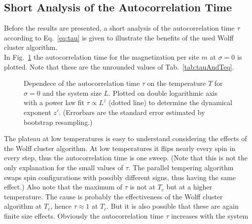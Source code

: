 \subsection{Short Analysis of the Autocorrelation Time}
\label{ssec:results:autocorr}
    Before the results are presented, a short analysis of the
    autocorrelation time \(\tau\) according to Eq.\ \ref{eq:tau} is given to
    illustrate the benefits of the used Wolff cluster algorithm.\\
    In Fig.\ \ref{fig:autocorr}
    the autocorrelation time for the magnetization per site \(m\) at
    \(\sigma=0\) is plotted. Note that these are the unrounded values
    of Tab.\ \ref{tab:tauAndTeq}.
    \begin{figure}[htbp]
        \centering
        \caption[The Autocorrelation Time $\tau$]
        {
            Dependece of the autocorrelation time $\tau$ on
             the temperature $T$ for
                $\sigma=0$ and
             the system size $L$. Plotted on
                double logarithmic axis with a power law fit \(\tau \propto L^z\) (dotted line)
                to determine the dynamical exponent \(z'\).
                (Errorbars are the standard error estimated by bootstrap resampling.)
        }
        \label{fig:autocorr}
    \end{figure}
    The plateau at low temperatures is easy to understand considering the
    effects of the Wolff cluster algorithm. At low temperatures it flips nearly every
    spin in every step, thus the autocorrelation time is one sweep.
    (Note that this is not the only explanation for the small values of \(\tau\).
    The parallel tempering algorithm swaps spin configurations
    with possibly different signs, thus having the same effect.)
    Also note that the maximum of \(\tau\) is not at \(T_c\) but at a higher
    temperature. The cause is probably the effectiveness of the Wolff cluster
    algorithm at \(T_c\), hence \(\tau \approx 1\) at \(T_{c}\).
    But it is also possible that these are again finite size effects.
    Obviously the autocorrelation time \(\tau\) increases with the system
